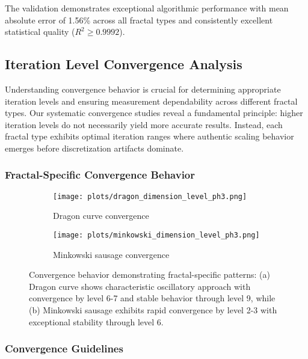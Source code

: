 \documentclass[preprint,12pt]{elsarticle}
\def\textbf#1{#1}%
\begin{document}
The validation demonstrates exceptional algorithmic performance with mean absolute error of 1.56\% across all fractal types and consistently excellent statistical quality ($R^2 \geq 0.9992$).

\subsection{Iteration Level Convergence Analysis}
\label{subsec:convergence_analysis}

Understanding convergence behavior is crucial for determining appropriate iteration levels and ensuring measurement dependability across different fractal types. Our systematic convergence studies reveal a fundamental principle: \textbf{higher iteration levels do not necessarily yield more accurate results}. Instead, each fractal type exhibits optimal iteration ranges where authentic scaling behavior emerges before discretization artifacts dominate.

\subsubsection{Fractal-Specific Convergence Behavior}

\begin{figure}[H]
\centering
\begin{subfigure}[b]{0.48\textwidth}
    \centering
    \texttt{[image: plots/dragon\_dimension\_level\_ph3.png]}
    \caption{Dragon curve convergence}
    \label{fig:dragon_convergence}
\end{subfigure}
\hfill
\begin{subfigure}[b]{0.48\textwidth}
    \centering
    \texttt{[image: plots/minkowski\_dimension\_level\_ph3.png]}
    \caption{Minkowski sausage convergence}
    \label{fig:minkowski_convergence}
\end{subfigure}
\caption{Convergence behavior demonstrating fractal-specific patterns: (a) Dragon curve shows characteristic oscillatory approach with convergence by level 6-7 and stable behavior through level 9, while (b) Minkowski sausage exhibits rapid convergence by level 2-3 with exceptional stability through level 6.}
\label{fig:convergence_examples}
\end{figure}

\subsubsection{Convergence Guidelines}
\end{document}
